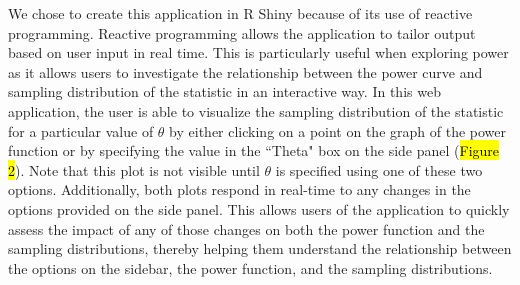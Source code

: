 \documentclass{TISE}
\begin{document}
We chose to create this application in {\sf R} Shiny because of its use of reactive programming. Reactive programming allows the application to tailor output based on user input in real time. This is particularly useful when exploring power as it allows users to investigate the relationship between the power curve and sampling distribution of the statistic in an interactive way. In this web application, the user is able to visualize the sampling distribution of the statistic for a particular value of $\theta$ by either clicking on a point on the graph of the power function or by specifying the value in the ``Theta" box on the side panel (\hl{Figure 2}). Note that this plot is not visible until $\theta$ is specified using one of these two options. Additionally, both plots respond in real-time to any changes in the options provided on the side panel. This allows users of the application to quickly assess the impact of any of those changes on both the power function and the sampling distributions, thereby helping them understand the relationship between the options on the sidebar, the power function, and the sampling distributions. 

\newpage
\end{document}
